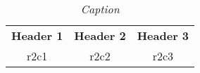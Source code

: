\begin{table}[htb!]
  \caption{\it Caption}
  \label{table:label}
  \centering
  \begin{tabular}{ccc}
    \toprule
    \textbf{Header 1} & \textbf{Header 2} & \textbf{Header 3}\\
                 r2c1 &              r2c2 &              r2c3\\
    \toprule
  \end{tabular}
\end{table}
